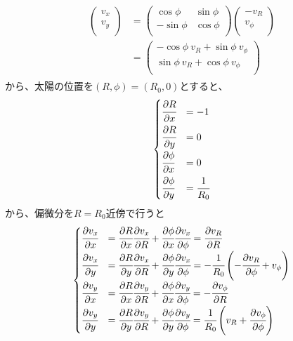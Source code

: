 \begin{align}
\begin{aligned}
	\left(
	\begin{array}{c}
	 	v_x\\
		v_y\\
	\end{array}
	\right)
	&=
	\left(
	\begin{array}{cc}
	 	\cos{\phi} & \sin{\phi}\\
		-\sin{\phi} & \cos{\phi}\\
	\end{array}
	\right)
	\left(
	\begin{array}{c}
	 	-v_R\\
		v_{\phi}\\
	\end{array}
	\right) \\
	&=
	\left(
	\begin{array}{c}
	 	-\cos{\phi}\ v_R + \sin{\phi}\ v_{\phi}\\
		\sin{\phi}\ v_R + \cos{\phi}\ v_{\phi}\\
	\end{array}
	\right)
\end{aligned}
\end{align}
から、太陽の位置を$(R,\phi)=(R_0,0)$とすると、
\begin{align}
\begin{cases}
	\cfrac{\partial R}{\partial x} &= -1 \\[2mm]
	\cfrac{\partial R}{\partial y} &= 0 \\[2mm]
	\cfrac{\partial \phi}{\partial x} &= 0 \\[2mm]
	\cfrac{\partial \phi}{\partial y} &= \cfrac{1}{R_0}
\end{cases}
\end{align}
から、偏微分を$R=R_0$近傍で行うと
\begin{align}
\begin{cases}
	\cfrac{\partial v_x}{\partial x} &= \cfrac{\partial R}{\partial x}\cfrac{\partial v_x}{\partial R} + \cfrac{\partial \phi}{\partial x}\cfrac{\partial v_x}{\partial \phi} = \cfrac{\partial v_R}{\partial R} \\[2mm]
	\cfrac{\partial v_x}{\partial y} &= \cfrac{\partial R}{\partial y}\cfrac{\partial v_x}{\partial R} + \cfrac{\partial \phi}{\partial y}\cfrac{\partial v_x}{\partial \phi} = -\cfrac{1}{R_0}\left(-\cfrac{\partial v_R}{\partial \phi} + v_{\phi}\right)\\[2mm]
	\cfrac{\partial v_y}{\partial x} &= \cfrac{\partial R}{\partial x}\cfrac{\partial v_y}{\partial R} + \cfrac{\partial \phi}{\partial x}\cfrac{\partial v_y}{\partial \phi} = -\cfrac{\partial v_{\phi}}{\partial R}\\[2mm]
	\cfrac{\partial v_y}{\partial y} &= \cfrac{\partial R}{\partial y}\cfrac{\partial v_y}{\partial R} + \cfrac{\partial \phi}{\partial y}\cfrac{\partial v_y}{\partial \phi} = \cfrac{1}{R_0}\left(v_R + \cfrac{\partial v_{\phi}}{\partial \phi}\right)
\end{cases}
\end{align}
